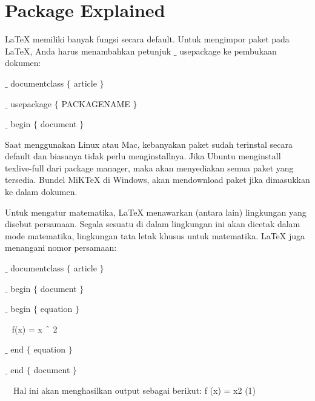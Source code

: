 \section{Package Explained}
\hspace{0.50in} LaTeX memiliki banyak fungsi secara default. Untuk mengimpor paket pada LaTeX, Anda harus menambahkan petunjuk  $ \_ $  usepackage ke pembukaan dokumen:\par

\noindent  $ \_ $ documentclass $ \{ $ article $ \} $ \par
\noindent  $ \_ $ usepackage $ \{ $ PACKAGENAME $ \} $ \par
\noindent  $ \_ $ begin $ \{ $ document $ \} $ \par

\vspace{12pt}
\hspace{0.50in} Saat menggunakan Linux atau Mac, kebanyakan paket sudah terinstal secara default dan biasanya tidak perlu menginstallnya. Jika Ubuntu menginstall texlive-full dari package manager, maka akan menyediakan semua paket yang tersedia. Bundel MiKTeX di Windows, akan mendownload paket jika dimasukkan ke dalam dokumen.\par
\hspace{0.50in} Untuk mengatur matematika, LaTeX menawarkan (antara lain) lingkungan yang disebut persamaan. Segala sesuatu di dalam lingkungan ini akan dicetak dalam mode matematika, lingkungan tata letak khusus untuk matematika. LaTeX juga menangani nomor persamaan:\par

{\fontsize{10pt}{10pt}\selectfont  $ \_ $ documentclass $ \{ $ article $ \} $ }\par

{\fontsize{10pt}{10pt}\selectfont  $ \_ $ begin $ \{ $ document $ \} $ }\par

{\fontsize{10pt}{10pt}\selectfont  $ \_ $ begin $ \{ $ equation $ \} $ }\par

{\fontsize{10pt}{10pt}\selectfont ~ f(x) = x $ \string^ $ 2}\par

{\fontsize{10pt}{10pt}\selectfont  $ \_ $ end $ \{ $ equation $ \} $ }\par

{\fontsize{10pt}{10pt}\selectfont  $ \_ $ end $ \{ $ document $ \} $ }\par
~~\noindent Hal ini akan menghasilkan output sebagai berikut: f (x) = x2 (1)\par

